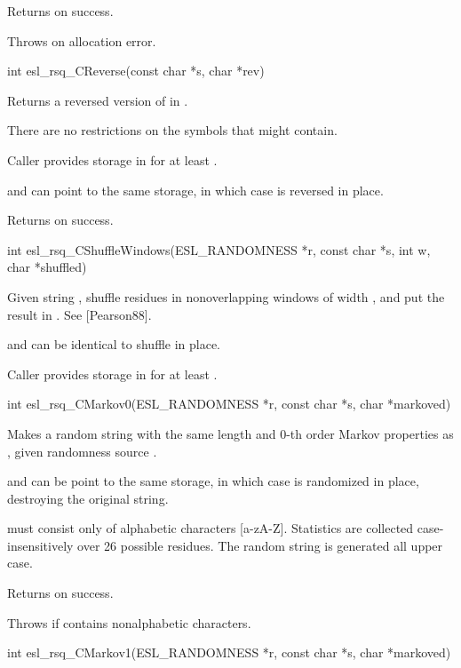 \begin{sreapi}
Returns  on success.

Throws  on allocation error.


\hypertarget{func:esl_rsq_CReverse()}
{\item[int esl\_rsq\_CReverse(const char *s, char *rev)]}

Returns a reversed version of  in . 

There are no restrictions on the symbols that 
might contain.

Caller provides storage in  for at least
.

 and  can point to the same storage, in which
case  is reversed in place.

Returns  on success.


\hypertarget{func:esl_rsq_CShuffleWindows()}
{\item[int esl\_rsq\_CShuffleWindows(ESL\_RANDOMNESS *r, const char *s, int w, char *shuffled)]}

Given string , shuffle residues in nonoverlapping
windows of width , and put the result in .
See [Pearson88].

 and  can be identical to shuffle in place.

Caller provides storage in  for at least
.



\hypertarget{func:esl_rsq_CMarkov0()}
{\item[int esl\_rsq\_CMarkov0(ESL\_RANDOMNESS *r, const char *s, char *markoved)]}

Makes a random string  with the same length and
0-th order Markov properties as , given randomness
source .

 and  can be point to the same storage, in which
case  is randomized in place, destroying the original
string.

 must consist only of alphabetic characters [a-zA-Z].
Statistics are collected case-insensitively over 26 possible
residues. The random string is generated all upper case.

Returns  on success.

Throws  if  contains nonalphabetic characters.


\hypertarget{func:esl_rsq_CMarkov1()}
{\item[int esl\_rsq\_CMarkov1(ESL\_RANDOMNESS *r, const char *s, char *markoved)]}


\end{sreapi}
